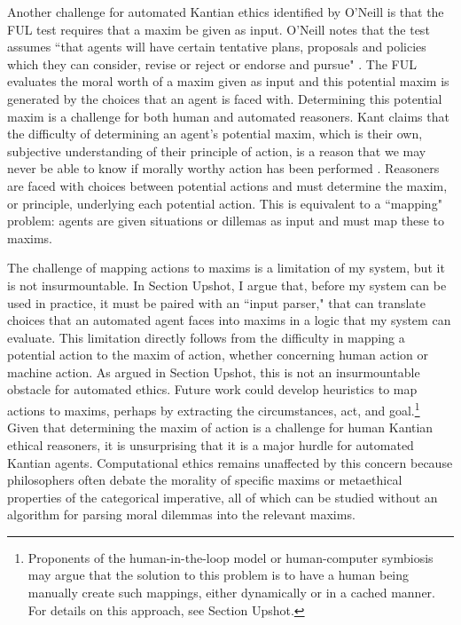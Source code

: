 \begin{isabellebody}
\begin{isamarkuptext}
Another challenge for automated Kantian ethics identified by O'Neill is that the FUL test requires that
a maxim be given as input. O'Neill notes that the test assumes ``that agents will have certain tentative 
plans, proposals and policies which they can consider, revise or reject or endorse and pursue" \citep[343]{oneilluniversallaws}.
The FUL evaluates the moral worth of a maxim given as input and this potential maxim is generated by 
the choices that an agent is faced with. Determining this potential maxim is a challenge for both human
and automated reasoners. Kant claims that the difficulty of determining an agent's potential maxim, which is their
own, subjective understanding of their principle of action, is a reason that we may never be able 
to know if morally worthy action has been performed \cite[345]{oneilluniversallaws}. Reasoners are faced with
choices between potential actions and must determine the maxim, or principle, underlying each potential action.
This is equivalent to a ``mapping" problem: agents are given situations or dillemas as input and must map
these to maxims.

The challenge of mapping actions to maxims is a limitation of my system, but it is not insurmountable. In Section Upshot,
I argue that, before my system can be used in practice, it must be paired with an ``input parser," that can
translate choices that an automated agent faces into maxims in a logic that my system can
evaluate. This limitation directly follows from the difficulty in mapping a potential action
to the maxim of action, whether concerning human action or machine action. As argued in Section Upshot,  
this is not an insurmountable obstacle for automated ethics. Future work could develop heuristics to 
map actions to maxims, perhaps by extracting the circumstances, act, and goal.\footnote{Proponents of the 
human-in-the-loop model \cite{hitl} or human-computer symbiosis \cite{licklider} may argue that the 
solution to this problem is to have a human being manually create
such mappings, either dynamically or in a cached manner. For details on this approach, see Section
Upshot.}  Given that determining the maxim of action is a challenge
for human Kantian ethical reasoners, it is unsurprising that it is a major hurdle for automated Kantian agents. 
Computational ethics remains unaffected by this concern because philosophers often debate 
the morality of specific maxims or metaethical properties of the categorical imperative, all of which can
be studied without an algorithm for parsing moral dilemmas into the relevant maxims.


\end{isamarkuptext}
\end{isabellebody}
